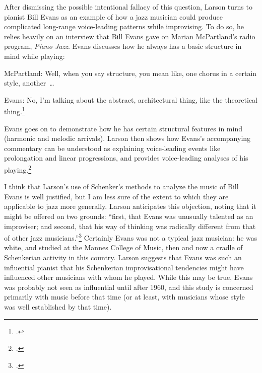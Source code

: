 After dismissing the possible intentional fallacy of this question, Larson
turns to pianist Bill Evans as an example of how a jazz musician could produce
complicated long-range voice-leading patterns while improvising. To do so, he
relies heavily on an interview that Bill Evans gave on Marian McPartland’s
radio program, \emph{Piano Jazz}. Evans discusses how he always has
a basic structure in mind while playing:
\begin{quoting}
  \singlespacing
  McPartland: Well, when you say structure, you mean like, one chorus in a
  certain style, another~\ldots

  \vspace{\baselineskip} \noindent
  Evans: No, I’m talking about the abstract, architectural thing, like the
  theoretical thing.\footcite[219]{larson:1998}
\end{quoting}
Evans goes on to demonstrate how he has certain structural features in mind
(harmonic and melodic arrivals). Larson then shows how Evans’s accompanying
commentary can be understood as explaining  voice-leading events like
prolongation and linear progressions, and provides voice-leading analyses of
his playing.\footcite[See especially the table in][229]{larson:1998}

I think that Larson’s use of Schenker’s methods to analyze the music of Bill
Evans is well justified, but I am less sure of the extent to which they are
applicable to jazz more generally. Larson anticipates this objection, noting
that it might be offered on two grounds: “first, that Evans was unusually
talented as an improviser; and second, that his way of thinking was radically
different from that of other jazz musicians.”\footcite[239]{larson:1998}
Certainly Evans was not a typical jazz musician: he was white, and studied at
the Mannes College of Music, then and now a cradle of Schenkerian activity in
this country. Larson suggests that Evans was such an influential pianist
that his Schenkerian improvisational tendencies might have influenced other
musicians with whom he played. While this may be true, Evans was probably
not seen as influential until after 1960, and this study is concerned
primarily with music before that time (or at least, with musicians whose style
was well established by that time).

